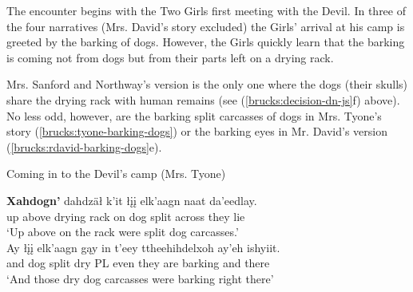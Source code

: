 The encounter begins with the Two Girls first meeting with the Devil. In three of the four narratives (Mrs. David's story excluded) the Girls' arrival at his camp is greeted by the barking of dogs. However, the Girls quickly learn that the barking is coming not from dogs but from their parts left on a drying rack.

Mrs. Sanford and Northway's version is the only one where the dogs (their skulls) share the drying rack with human remains (see (\ref{brucks:decision-dn-js}f) above). No less odd, however, are the barking split carcasses of dogs in Mrs. Tyone's story (\ref{brucks:tyone-barking-dogs}) or the barking eyes in Mr. David's version (\ref{brucks:rdavid-barking-dogs}e).

\begin{exe}
\ex Coming in to the Devil's camp (Mrs. Tyone) \label{brucks:tyone-barking-dogs}
\begin{xlist}

\ex \gll \textbf{Xahdogn'} dahdzäł k'it łįį elk'aagn naat da'eedlay.   \\
 {up above} {drying rack} on dog split across {they lie}  \\
\glt `Up above on the rack were split dog carcasses.' \\

\ex \gll  Ay łįį elk'aagn gąy in t'eey ttheehihdelxoh ay'eh ishyiit.  \\
  and dog split dry PL even {they are barking} and there \\
\glt `And those dry dog carcasses were barking right there' \\
\end{xlist}
\end{exe}

